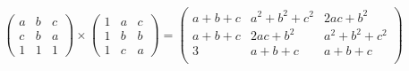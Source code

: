 {{$$\left( \begin{array}{ccc} a &b& c \\ c & b & a \\ 1 & 1 & 1\end{array} \right)
\times
 \left( \begin{array}{ccc} 1 &a& c \\ 1 & b & b \\ 1 & c & a\end{array} \right) 
 = \begin{pmatrix}
    a + b + c & a^2+b^2+c^2 & 2ac + b^2 \\
    a + b + c & 2ac + b^2   & a^2+b^2+c^2 \\
    3         &  a+b+c      & a+b+c \\
\end{pmatrix}$$}
}